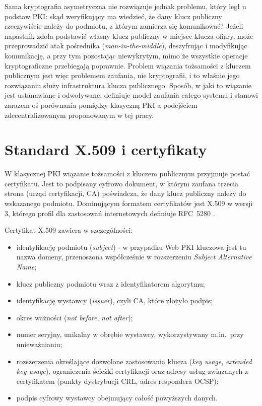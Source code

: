 Sama kryptografia asymetryczna nie rozwiązuje jednak problemu, który legł u podstaw PKI: skąd weryfikujący ma wiedzieć, że dany klucz publiczny rzeczywiście należy do podmiotu, z którym zamierza się komunikować? Jeżeli napastnik zdoła podstawić własny klucz publiczny w miejsce klucza ofiary, może przeprowadzić atak pośrednika (\emph{man-in-the-middle}), deszyfrując i modyfikując komunikację, a przy tym pozostając niewykrytym, mimo że wszystkie operacje kryptograficzne przebiegają poprawnie. Problem wiązania tożsamości z kluczem publicznym jest więc problemem zaufania, nie kryptografii, i to właśnie jego rozwiązaniu służy infrastruktura klucza publicznego. Sposób, w jaki to wiązanie jest ustanawiane i odwoływane, definiuje model zaufania całego systemu i stanowi zarazem oś porównania pomiędzy klasyczną PKI a podejściem zdecentralizowanym proponowanym w tej pracy.

\section{Standard X.509 i certyfikaty}
\label{sec:x509}

W klasycznej PKI wiązanie tożsamości z kluczem publicznym przyjmuje postać certyfikatu. Jest to podpisany cyfrowo dokument, w którym zaufana trzecia strona (urząd certyfikacji, CA) poświadcza, że dany klucz publiczny należy do wskazanego podmiotu. Dominującym formatem certyfikatów jest X.509 w wersji 3, którego profil dla zastosowań internetowych definiuje RFC~5280 \cite{rfc5280}.

Certyfikat X.509 zawiera w szczególności:
\begin{itemize}
    \item identyfikację podmiotu (\emph{subject}) - w przypadku Web PKI kluczowa jest tu nazwa domeny, przenoszona współcześnie w rozszerzeniu \emph{Subject Alternative Name};
    \item klucz publiczny podmiotu wraz z identyfikatorem algorytmu;
    \item identyfikację wystawcy (\emph{issuer}), czyli CA, które złożyło podpis;
    \item okres ważności (\emph{not before}, \emph{not after});
    \item numer seryjny, unikalny w obrębie wystawcy, wykorzystywany m.in.\ przy unieważnianiu;
    \item rozszerzenia określające dozwolone zastosowania klucza (\emph{key usage}, \emph{extended key usage}), ograniczenia ścieżki certyfikacji oraz adresy usług związanych z certyfikatem (punkty dystrybucji CRL, adres respondera OCSP);
    \item podpis cyfrowy wystawcy obejmujący całość powyższych danych.
\end{itemize}

